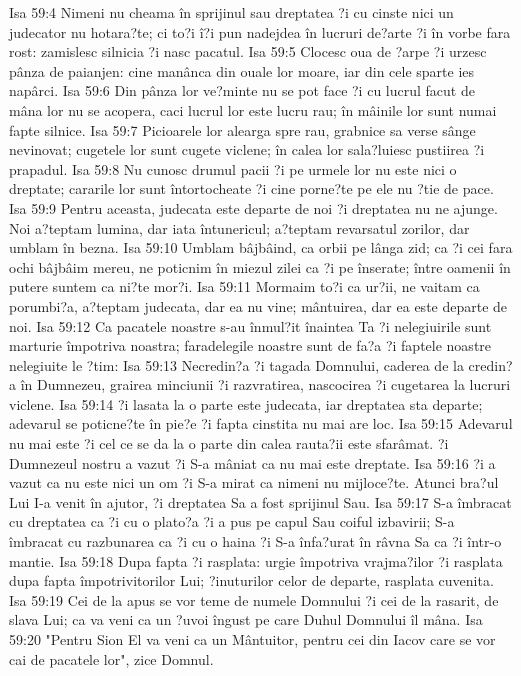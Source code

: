 Isa 59:4  Nimeni nu cheama în sprijinul sau dreptatea ?i cu cinste nici un judecator nu hotara?te; ci to?i î?i pun nadejdea în lucruri de?arte ?i în vorbe fara rost: zamislesc silnicia ?i nasc pacatul.
Isa 59:5  Clocesc oua de ?arpe ?i urzesc pânza de paianjen: cine manânca din ouale lor moare, iar din cele sparte ies napârci.
Isa 59:6  Din pânza lor ve?minte nu se pot face ?i cu lucrul facut de mâna lor nu se acopera, caci lucrul lor este lucru rau; în mâinile lor sunt numai fapte silnice.
Isa 59:7  Picioarele lor alearga spre rau, grabnice sa verse sânge nevinovat; cugetele lor sunt cugete viclene; în calea lor sala?luiesc pustiirea ?i prapadul.
Isa 59:8  Nu cunosc drumul pacii ?i pe urmele lor nu este nici o dreptate; cararile lor sunt întortocheate ?i cine porne?te pe ele nu ?tie de pace.
Isa 59:9  Pentru aceasta, judecata este departe de noi ?i dreptatea nu ne ajunge. Noi a?teptam lumina, dar iata întunericul; a?teptam revarsatul zorilor, dar umblam în bezna.
Isa 59:10  Umblam bâjbâind, ca orbii pe lânga zid; ca ?i cei fara ochi bâjbâim mereu, ne poticnim în miezul zilei ca ?i pe înserate; între oamenii în putere suntem ca ni?te mor?i.
Isa 59:11  Mormaim to?i ca ur?ii, ne vaitam ca porumbi?a, a?teptam judecata, dar ea nu vine; mântuirea, dar ea este departe de noi.
Isa 59:12  Ca pacatele noastre s-au înmul?it înaintea Ta ?i nelegiuirile sunt marturie împotriva noastra; faradelegile noastre sunt de fa?a ?i faptele noastre nelegiuite le ?tim:
Isa 59:13  Necredin?a ?i tagada Domnului, caderea de la credin?a în Dumnezeu, grairea minciunii ?i razvratirea, nascocirea ?i cugetarea la lucruri viclene.
Isa 59:14  ?i lasata la o parte este judecata, iar dreptatea sta departe; adevarul se poticne?te în pie?e ?i fapta cinstita nu mai are loc.
Isa 59:15  Adevarul nu mai este ?i cel ce se da la o parte din calea rauta?ii este sfarâmat. ?i Dumnezeul nostru a vazut ?i S-a mâniat ca nu mai este dreptate.
Isa 59:16  ?i a vazut ca nu este nici un om ?i S-a mirat ca nimeni nu mijloce?te. Atunci bra?ul Lui I-a venit în ajutor, ?i dreptatea Sa a fost sprijinul Sau.
Isa 59:17  S-a îmbracat cu dreptatea ca ?i cu o plato?a ?i a pus pe capul Sau coiful izbavirii; S-a îmbracat cu razbunarea ca ?i cu o haina ?i S-a înfa?urat în râvna Sa ca ?i într-o mantie.
Isa 59:18  Dupa fapta ?i rasplata: urgie împotriva vrajma?ilor ?i rasplata dupa fapta împotrivitorilor Lui; ?inuturilor celor de departe, rasplata cuvenita.
Isa 59:19  Cei de la apus se vor teme de numele Domnului ?i cei de la rasarit, de slava Lui; ca va veni ca un ?uvoi îngust pe care Duhul Domnului îl mâna.
Isa 59:20  "Pentru Sion El va veni ca un Mântuitor, pentru cei din Iacov care se vor cai de pacatele lor", zice Domnul.

